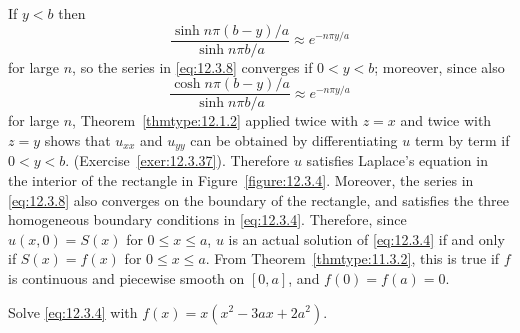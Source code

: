\begin{examplesolution}
If $y<b$ then
\begin{equation}
  \label{eq:12.3.9}\frac{\sinh n\pi(b-y)/a}{\sinh n\pi b/a}\approx e^{-n\pi y/a}
\end{equation}
for large $n$, so the series in \eqref{eq:12.3.8} converges if $0<y<b$; moreover, since also
\[
  \frac{\cosh n\pi(b-y)/a}{\sinh n\pi b/a}\approx e^{-n\pi y/a}
\]
for large $n$, Theorem~\ref{thmtype:12.1.2} applied twice with $z=x$ and twice with $z=y$ shows
that $u_{xx}$ and $u_{yy}$ can be obtained by differentiating $u$ term by term if $0<y<b$.
(Exercise~\ref{exer:12.3.37}). Therefore $u$ satisfies Laplace's equation in the interior of the
rectangle in Figure~\ref{figure:12.3.4}. Moreover, the series in \eqref{eq:12.3.8} also converges on
the boundary of the rectangle, and satisfies the three homogeneous boundary conditions in
\eqref{eq:12.3.4}. Therefore, since $u(x,0)=S(x)$ for $0\le x\le a$, $u$ is an actual solution of
\eqref{eq:12.3.4} if and only if $S(x)=f(x)$ for $0\le x\le a$. From Theorem~\ref{thmtype:11.3.2},
this is true if $f$ is continuous and piecewise smooth on $[0,a]$, and $f(0)=f(a)=0$.
\end{examplesolution}

\begin{example}
  \label{example:12.3.2} \rm Solve \eqref{eq:12.3.4} with $f(x)=x(x^{2}-3ax+2a^{2})$.
\end{example}

